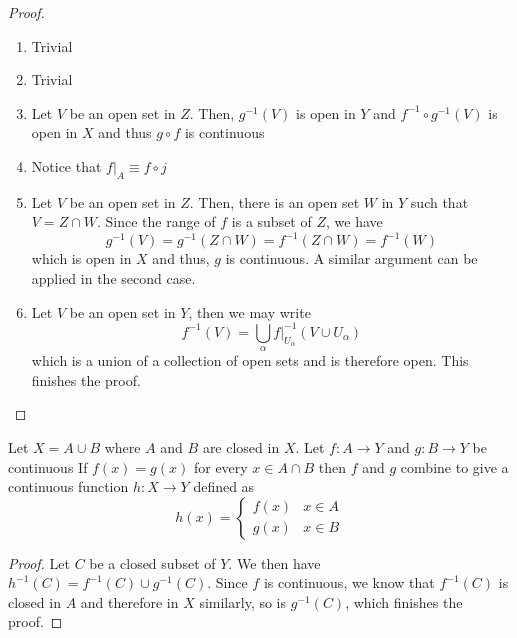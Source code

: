 \begin{proof}
    \hfill 
    \begin{enumerate}
        \item Trivial
        \item Trivial
        \item Let $V$ be an open set in $Z$. Then, $g^{-1}(V)$ is open in $Y$ and $f^{-1}\circ g^{-1}(V)$ is open in $X$ and thus $g\circ f$ is continuous
        \item Notice that $f|_A\equiv f\circ j$
        \item Let $V$ be an open set in $Z$. Then, there is an open set $W$ in $Y$ such that $V = Z\cap W$. Since the range of $f$ is a subset of $Z$, we have
        \begin{equation*}
            g^{-1}(V) = g^{-1}(Z\cap W) = f^{-1}(Z\cap W) = f^{-1}(W)
        \end{equation*}
        which is open in $X$ and thus, $g$ is continuous. A similar argument can be applied in the second case.
        \item Let $V$ be an open set in $Y$, then we may write 
        \begin{equation*}
            f^{-1}(V) = \bigcup_{\alpha}f|_{U_\alpha}^{-1}(V\cup U_\alpha)
        \end{equation*}
        which is a union of a collection of open sets and is therefore open. This finishes the proof.
    \end{enumerate}
\end{proof}

\begin{lemma}
    Let $X = A\cup B$ where $A$ and $B$ are closed in $X$. Let $f:A\to Y$ and $g:B\to Y$ be continuous If $f(x) = g(x)$ for every $x\in A\cap B$ then $f$ and $g$ combine to give a continuous function $h:X\to Y$ defined as 
    \begin{equation*}
        h(x) =
        \begin{cases}
            f(x) & x\in A\\
            g(x) & x\in B
        \end{cases}
    \end{equation*}
\end{lemma}
\begin{proof}
    Let $C$ be a closed subset of $Y$. We then have $h^{-1}(C) = f^{-1}(C)\cup g^{-1}(C)$. Since $f$ is continuous, we know that $f^{-1}(C)$ is closed in $A$ and therefore in $X$ similarly, so is $g^{-1}(C)$, which finishes the proof.
\end{proof}

